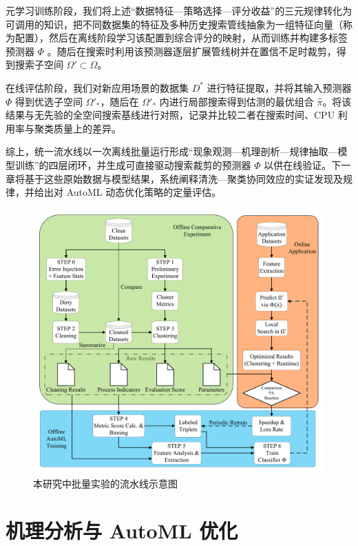 \documentclass[10pt]{article} %
\numberwithin{equation}{section}
\begin{document}
元学习训练阶段，我们将上述“数据特征—策略选择—评分收益”的三元规律转化为可调用的知识，把不同数据集的特征及多种历史搜索管线抽象为一组特征向量（称为配置），然后在离线阶段学习该配置到综合评分的映射，从而训练并构建多标签预测器 $\varPhi$ 。随后在搜索时利用该预测器逐层扩展管线树并在置信不足时裁剪，得到搜索子空间 $\Omega' \subset \Omega$。 

在线评估阶段，我们对新应用场景的数据集 $D^\ast$ 进行特征提取，并将其输入预测器 $\varPhi$ 得到优选子空间 $\Omega'_\ast$，随后在 $\Omega'_\ast$ 内进行局部搜索得到估测的最优组合 $\hat{\pi}$。将该结果与无先验的全空间搜索基线进行对照，记录并比较二者在搜索时间、CPU 利用率与聚类质量上的差异。 

综上，统一流水线以一次离线批量运行形成“现象观测—机理剖析—规律抽取—模型训练”的四层闭环，并生成可直接驱动搜索裁剪的预测器 \(\varPhi\) 以供在线验证。下一章将基于这些原始数据与模型结果，系统阐释清洗—聚类协同效应的实证发现及规律，并给出对 AutoML 动态优化策略的定量评估。

\begin{figure}[t]
  \centering
  \includegraphics[width=0.95\linewidth]{figures/4graph/flowchart1.pdf}
  \caption{本研究中批量实验的流水线示意图}
  \label{fig:exp_flow}
\end{figure}

\section{机理分析与 AutoML 优化}
\label{sec:chapter6}
\end{document}
